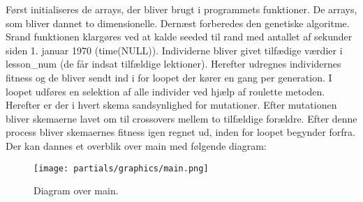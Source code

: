 Først initialiseres de arrays, der bliver brugt i programmets funktioner. De arrays, som bliver dannet to dimensionelle.
Dernæst forberedes den genetiske algoritme. Srand funktionen klargøres ved at kalde seeded til rand med antallet af sekunder siden 1. januar 1970 (time(NULL)). Individerne bliver givet tilfædige værdier i lesson\_num (de får indsat tilfældige lektioner). Herefter udregnes individernes fitness og de bliver sendt ind i for loopet der kører en gang per generation. I loopet udføres en selektion af alle individer ved hjælp af roulette metoden. Herefter er der i hvert skema sandsynlighed for mutationer. Efter mutationen bliver skemaerne lavet om til crossovers mellem to tilfældige forældre. Efter denne process bliver skemaernes fitness igen regnet ud, inden for loopet begynder forfra. Der kan dannes et overblik over main med følgende diagram:
\begin{figure}[!h]
  \centering
  \texttt{[image: partials/graphics/main.png]}
  \caption{Diagram over main.}
  \label{fig:main}
\end{figure}

